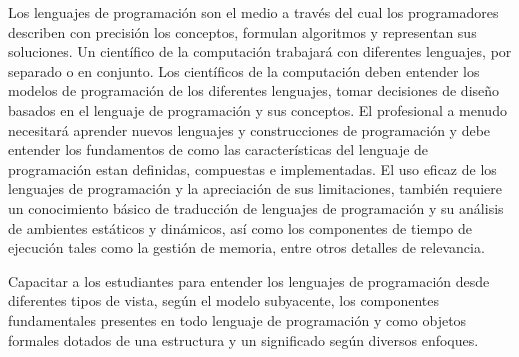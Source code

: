 \begin{syllabus}


\begin{justification}
Los lenguajes de programación son el medio a través del cual los programadores describen con precisión los conceptos, 
formulan algoritmos y representan sus soluciones. Un científico de la computación trabajará con diferentes lenguajes, 
por separado o en conjunto. Los científicos de la computación deben entender los modelos de programación de los diferentes 
lenguajes, tomar decisiones de diseño basados en el lenguaje de programación y sus conceptos. El profesional a menudo 
necesitará aprender nuevos lenguajes y construcciones de programación y debe entender los fundamentos de como las 
características del lenguaje de programación estan definidas, compuestas e implementadas. El uso eficaz de los lenguajes 
de programación y la apreciación de sus limitaciones, también requiere un conocimiento básico de traducción de lenguajes 
de programación y su análisis de ambientes estáticos y dinámicos, así como los componentes de tiempo de ejecución tales 
como la gestión de memoria, entre otros detalles de relevancia.
\end{justification}

\begin{goals}
\item Capacitar a los estudiantes para entender los lenguajes de programación desde diferentes tipos de vista, según el 
modelo subyacente, los componentes fundamentales presentes en todo lenguaje de programación y como objetos formales 
dotados de una estructura y un significado según diversos enfoques.
\end{goals}

\begin{outcomes}
    \item {}
    \item {}
    \item {} 
    \item {} 
		
\end{outcomes}

\begin{competences}
    \item {} 
    \item {}
    \item {}
    \item {}
    \item {}
\end{competences}


\end{syllabus}

